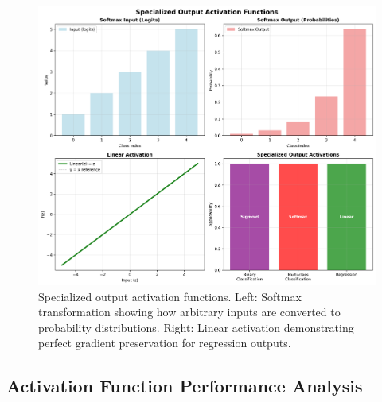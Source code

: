 \documentclass[11pt,a4paper]{report}
\begin{document}
\begin{figure}[H]
\centering
\includegraphics[width=\textwidth]{activation_specialized_output.png}
\caption{Specialized output activation functions. Left: Softmax transformation showing how arbitrary inputs are converted to probability distributions. Right: Linear activation demonstrating perfect gradient preservation for regression outputs.}
\label{fig:activation_specialized}
\end{figure}

\subsection{Activation Function Performance Analysis}
\end{document}
